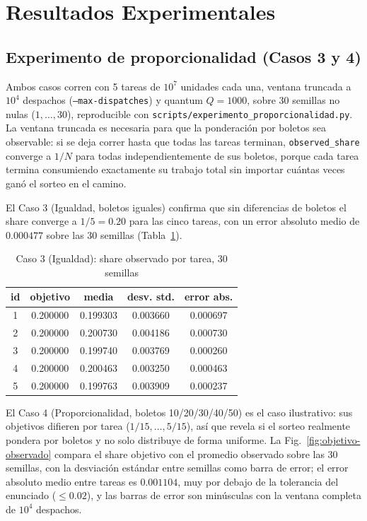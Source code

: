 \section{Resultados Experimentales}
\label{sec:resultados}

\subsection{Experimento de proporcionalidad (Casos 3 y 4)}

Ambos casos corren con 5 tareas de $10^{7}$ unidades cada una, ventana
truncada a $10^4$ despachos (\texttt{--max-dispatches}) y quantum $Q=1000$,
sobre 30 semillas no nulas ($1, \ldots, 30$), reproducible con
\texttt{scripts/experimento\_proporcionalidad.py}. La ventana truncada es
necesaria para que la ponderación por boletos
sea observable: si se deja correr hasta que todas las tareas terminan,
\texttt{observed\_share} converge a $1/N$ para todas independientemente de
sus boletos, porque cada tarea termina consumiendo exactamente su trabajo
total sin importar cuántas veces ganó el sorteo en el camino.

El Caso 3 (Igualdad, boletos iguales) confirma que sin diferencias de
boletos el share converge a $1/5 = 0.20$ para las cinco tareas, con un error
absoluto medio de $0.000477$ sobre las 30 semillas (Tabla~\ref{tab:caso3}).

\begin{table}[htbp]
\caption{Caso 3 (Igualdad): share observado por tarea, 30 semillas}
\label{tab:caso3}
\centering
\begin{tabular}{ccccc}
\toprule
id & objetivo & media & desv. std. & error abs. \\
\midrule
1 & 0.200000 & 0.199303 & 0.003660 & 0.000697 \\
2 & 0.200000 & 0.200730 & 0.004186 & 0.000730 \\
3 & 0.200000 & 0.199740 & 0.003769 & 0.000260 \\
4 & 0.200000 & 0.200463 & 0.003250 & 0.000463 \\
5 & 0.200000 & 0.199763 & 0.003909 & 0.000237 \\
\bottomrule
\end{tabular}
\end{table}

El Caso 4 (Proporcionalidad, boletos 10/20/30/40/50) es el caso ilustrativo:
sus objetivos difieren por tarea ($1/15, \ldots, 5/15$), así que revela si el
sorteo realmente pondera por boletos y no solo distribuye de forma uniforme.
La Fig.~\ref{fig:objetivo-observado} compara el share objetivo con el
promedio observado sobre las 30 semillas, con la desviación estándar entre
semillas como barra de error; el error absoluto medio entre tareas es
$0.001104$, muy por debajo de la tolerancia del enunciado ($\leq 0.02$), y
las barras de error son minúsculas con la ventana completa de $10^4$
despachos.

